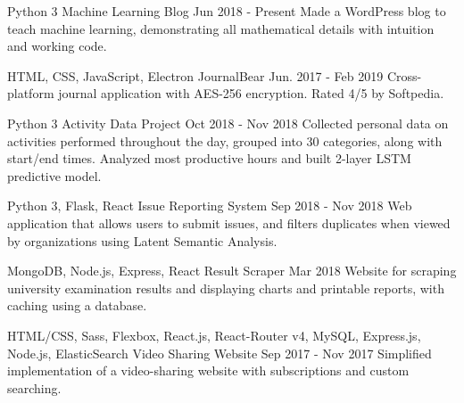 

\begin{cventries}

  \cventry
    {Python 3} %
    {Machine Learning Blog} %
    {} %
    {Jun 2018 - Present} %
    {
      Made a WordPress blog to teach machine learning, demonstrating all mathematical details with intuition and working code.
    }

  \cventry
    {HTML, CSS, JavaScript, Electron} %
    {JournalBear} %
    {} %
    {Jun. 2017 - Feb 2019} %
    {
      Cross-platform journal application with AES-256 encryption. Rated 4/5 by Softpedia.
    }

  \cventry
    {Python 3} %
    {Activity Data Project} %
    {} %
    {Oct 2018 - Nov 2018} %
    {
      Collected personal data on activities performed throughout the day, grouped into 30 categories, along with start/end times. Analyzed most productive hours and built 2-layer LSTM predictive model.
    }

  \cventry
    {Python 3, Flask, React} %
    {Issue Reporting System} %
    {} %
    {Sep 2018 - Nov 2018} %
    {
      Web application that allows users to submit issues, and filters duplicates when viewed by organizations using Latent Semantic Analysis.
    }

  \cventry
    {MongoDB, Node.js, Express, React} %
    {Result Scraper} %
    {} %
    {Mar 2018} %
    {
      Website for scraping university examination results and displaying charts and printable reports, with caching using a database.
    }

  \cventry
    {HTML/CSS, Sass, Flexbox, React.js, React-Router v4, MySQL, Express.js, Node.js, ElasticSearch} %
    {Video Sharing Website} %
    {} %
    {Sep 2017 - Nov 2017} %
    {
      Simplified implementation of a video-sharing website with subscriptions and custom searching.
    }


\end{cventries}
